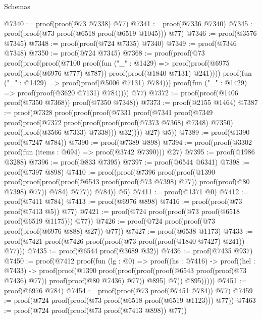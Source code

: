 \begin{lexlean}{Schemas}
\begin{coremodule}
@7340 := proof(proof(@73 @7338) @77)
@7341 := proof(@7336 @7340)
@7345 := proof(proof(@73 proof(@6518 proof(@6519 @1045))) @77)
@7346 := proof(@3576 @7345)
@7348 := proof(proof(@724 @7335) @7340)
@7349 := proof(@7346 @7348)
@7350 := proof(@724 @7345)
@7368 := proof(proof(@73
        proof(proof(proof(@7100
                proof(fun ("_" : @1429) =>
                  proof(proof(@6975 proof(proof(@6976 @777) @787)) proof(proof(@1840 @7131) @241))))
              proof(fun ("_" : @1429) => proof(proof(@5006 @7131) @784)))
            proof(fun ("_" : @1429) => proof(proof(@3620 @7131) @784))))
      @77)
@7372 := proof(proof(@1406 proof(@7350 @7368)) proof(@7350 @7348))
@7373 := proof(@2155 @1464)
@7387 := proof(@7328
      proof(proof(proof(@7331
              proof(@7341
                  proof(@7349
                      proof(proof(@7372
                            proof(proof(proof(proof(@7373 @7368) @7348) @7350)
                                proof(proof(@3566 @7333) @7338)))
                          @32))))
            @27)
          @5))
@7389 := proof(@1390 proof(@7247 @784))
@7390 := proof(@7389 @898)
@7394 := proof(proof(@3302 proof(fun (items : @694) => proof(@3742 @7390))) @27)
@7395 := proof(@1986 @3288)
@7396 := proof(@833 @7395)
@7397 := proof(@6544 @6341)
@7398 := proof(@7397 @898)
@7410 := proof(proof(@7396
        proof(proof(@1390
              proof(proof(proof(proof(@6543 proof(proof(@73 @7398) @77))
                      proof(proof(@80 @7398) @77))
                    @784)
                  @777))
            @784))
      @5)
@7411 := proof(@1371 @0)
@7412 := proof(@7411 @784)
@7413 := proof(@6976 @898)
@7416 := proof(proof(@73 proof(@7413 @5)) @77)
@7421 := proof(@724 proof(proof(@73 proof(@6518 proof(@6519 @1175))) @77))
@7426 := proof(@724 proof(proof(@73 proof(proof(@6976 @888) @27)) @77))
@7427 := proof(@6538 @1173)
@7433 := proof(@7421 proof(@7426 proof(proof(@73 proof(proof(@1840 @7427) @241)) @77)))
@7435 := proof(@6544 proof(@3689 @32))
@7436 := proof(@7435 @937)
@7450 := proof(@7412
      proof(fun (lg : @0) =>
        proof((hs : @7416) ->
          proof((hel : @7433) ->
            proof(proof(@1390
                  proof(proof(proof(proof(@6543 proof(proof(@73 @7436) @77))
                          proof(proof(@80 @7436) @77))
                        @895)
                      @7))
                @895)))))
@7451 := proof(@6976 @784)
@7454 := proof(proof(@73 proof(@7451 @784)) @77)
@7459 := proof(@724 proof(proof(@73 proof(@6518 proof(@6519 @1123))) @77))
@7463 := proof(@724 proof(proof(@73 proof(@7413 @898)) @77))

\end{coremodule}
\end{lexlean}

